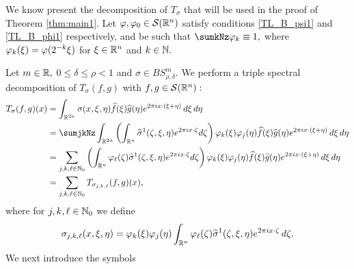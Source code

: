 We know present the decomposition of $T_\sigma$ that will be used in the proof of Theorem \ref{thm:main1}. Let $\varphi,\varphi_0 \in {\mathcal{S}}({{\mathbb R}^n})$ satisfy conditions \ref{TL_B_psi1} and \ref{TL_B_phi1} respectively, and be such that $\sumkNz \fk \equiv 1,$ where $\varphi_k(\xi)=\varphi(2^{-k}\xi)$ for $\xi\in{{\mathbb R}^n}$ and $k\in\mathbb{N}.$

Let $m \in \mathbb{R},$ $0 \leq \delta\le \rho < 1$ and $\sigma \in BS^m_{\rho, \delta}.$  We perform a triple spectral decomposition of $T_\sigma(f,g)$ with $f,g\in{\mathcal{S}}({{\mathbb R}^n}):$
\begin{align*}
T_\sigma(f,g)(x)&= \int_{\rtn} \sigma(x, \xi, \eta) \fhat(\xi) \ghat(\eta) \eixxe \dxi \deta \\
& =  \sumjkNz \int_{\rtn} \left( \int_{\rn} \widehat{\sigma}^1(\zeta, \xi, \eta) \eixzeta  d\zeta \right) \fk(\xi) \fj(\eta) \fhat(\xi) \ghat(\eta) \eixxe \dxi \deta\\
& =  \sum_{j,k,\ell\in\na_0} \left( \int_{\rn} \f_\ell(\zeta)\widehat{\sigma}^1(\zeta, \xi, \eta) \eixzeta  d\zeta \right) \fk(\xi) \fj(\eta) \fhat(\xi) \ghat(\eta) \eixxe \dxi \deta\\
&= \sum_{j,k,\ell\in\na_0}  T_{\sigma_{j,k,\ell}}(f,g)(x),
\end{align*}
where for $j,k, \ell \in \mathbb{N}_0$ we define
\begin{equation*}
\sigma_{j,k,\ell}(x, \xi, \eta)= \varphi_k(\xi) \varphi_j(\eta) \int_{{{\mathbb R}^n}}  \varphi_\ell(\zeta) \widehat{\sigma}^1(\zeta, \xi, \eta) e^{2\pi i x \cdot \zeta}  \, d\zeta.
\end{equation*}
We next introduce the symbols  

